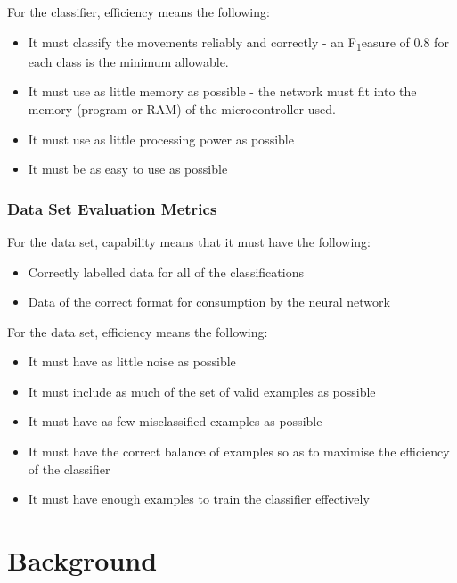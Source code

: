 \documentclass[a4paper]{article}
\begin{document}
For the classifier, efficiency means the following:

\begin{itemize}
\item It must classify the movements reliably and correctly - an F\texorpdfstring{\textsubscript{1}} measure of 0.8 for each class is the minimum allowable.
\item It must use as little memory as possible - the network must fit into the memory (program or RAM) of the microcontroller used.
\item It must use as little processing power as possible
\item It must be as easy to use as possible
\end{itemize}

\subsubsection{Data Set Evaluation Metrics}
\label{subsubsec:in_cs_dsmetrics}

For the data set, capability means that it must have the following:

\begin{itemize}
\item Correctly labelled data for all of the classifications
\item Data of the correct format for consumption by the neural network
\end{itemize}

For the data set, efficiency means the following:
\begin{itemize}
\item It must have as little noise as possible
\item It must include as much of the set of valid examples as possible
\item It must have as few misclassified examples as possible
\item It must have the correct balance of examples so as to maximise the efficiency of the classifier
\item It must have enough examples to train the classifier effectively
\end{itemize}

\newpage
\section{Background}
\label{sec:bg}
\end{document}

